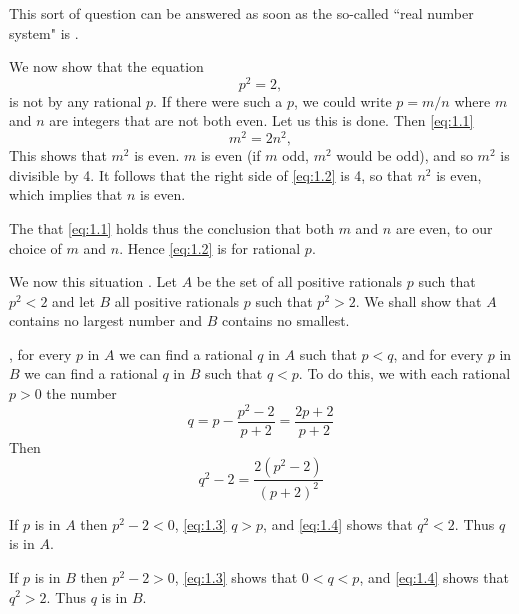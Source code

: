 \documentclass[
  leqno, 
  theme = Fresh Green,
  font = source-han,
  lang = en,
  usesamecnt
]{elegantbook-l3}
\newcounter{notemark}
\begin{document}
This sort of question can be answered as soon as the so-called ``real number system" is .
\begin{theorem}
  We now show that the equation
  \begin{equation}\label{eq:1.1}
    p^2 = 2,
  \end{equation}
  is not  by any rational $p$. If there were such a $p$, we could write $p=m / n$ where $m$ and $n$ are integers that are not both even. Let us  this is done. Then \eqref{eq:1.1} 
  \begin{equation}\label{eq:1.2}
    m^2 = 2n^2,
  \end{equation}
  This shows that $m^2$ is even.  $m$ is even (if $m$  odd, $m^2$ would be odd), and so $m^2$ is divisible by 4. It follows that the right side of \eqref{eq:1.2} is  4, so that $n^2$ is even, which implies that $n$ is even.

  The  that \eqref{eq:1.1} holds thus  the conclusion that both $m$ and $n$ are even,  to our choice of $m$ and $n$. Hence \eqref{eq:1.2} is  for rational $p$.

  We now  this situation . Let $A$ be the set of all positive rationals $p$ such that $p^2<2$ and let $B$  all positive rationals $p$ such that $p^2>2$. We shall show that $A$ contains no largest number and $B$ contains no smallest.

  , for every $p$ in $A$ we can find a rational $q$ in $A$ such that $p<q$, and for every $p$ in $B$ we can find a rational $q$ in $B$ such that $q<p$. To do this, we  with each rational $p>0$ the number
  \begin{equation}\label{eq:1.3}
    q=p-\frac{p^2-2}{p+2}=\frac{2 p+2}{p+2}
  \end{equation}
  Then
  \begin{equation}\label{eq:1.4}
    q^2-2=\frac{2\left(p^2-2\right)}{(p+2)^2}
  \end{equation}
  
  If $p$ is in $A$ then $p^2-2<0$, \eqref{eq:1.3}  $q>p$, and \eqref{eq:1.4} shows that $q^2<2$. Thus $q$ is in $A$.

  If $p$ is in $B$ then $p^2-2>0$, \eqref{eq:1.3} shows that $0<q<p$, and \eqref{eq:1.4} shows that $q^2>2$. Thus $q$ is in $B$.
\end{theorem}
\end{document}
